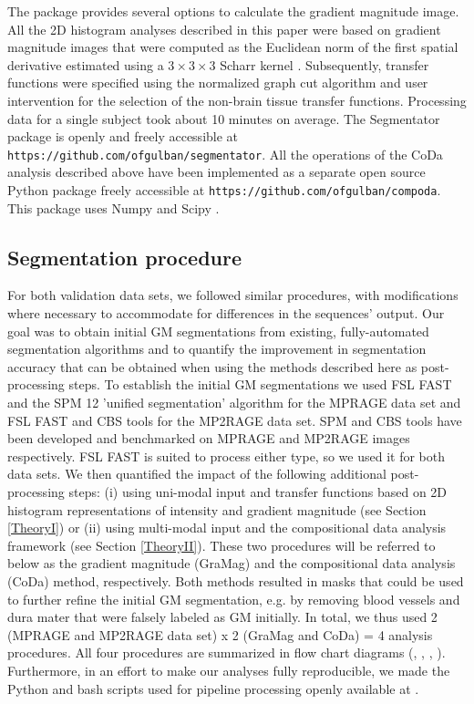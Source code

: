 The package provides several options to calculate the gradient magnitude image. All the 2D histogram analyses described in this paper were based on gradient magnitude images that were computed as the Euclidean norm of the first spatial derivative estimated using a $3 \times 3 \times 3$ Scharr kernel \cite{Scharr2000, Jahne2000}. Subsequently, transfer functions were specified using the normalized graph cut algorithm and user intervention for the selection of the non-brain tissue transfer functions. Processing data for a single subject took about 10 minutes on average. The Segmentator package is openly and freely accessible at \texttt{https://github.com/ofgulban/segmentator}. All the operations of the CoDa analysis described above have been implemented as a separate open source Python package \cite{compoda} freely accessible at \texttt{https://github.com/ofgulban/compoda}. This package uses Numpy \cite{numpy2011} and Scipy \cite{scipy2001}.

\subsection{Segmentation procedure}
For both validation data sets, we followed similar procedures, with modifications where necessary to accommodate for differences in the sequences' output. Our goal was to obtain initial GM segmentations from existing, fully-automated segmentation algorithms and to quantify the improvement in segmentation accuracy that can be obtained when using the methods described here as post-processing steps. To establish the initial GM segmentations we used FSL FAST \cite{Zhang2001} and the SPM 12 'unified segmentation' algorithm \cite{Ashburner2005} for the MPRAGE data set and FSL FAST and CBS tools \cite{Bazin2014} for the MP2RAGE data set. SPM and CBS tools have been developed and benchmarked on MPRAGE and MP2RAGE images respectively. FSL FAST is suited to process either type, so we used it for both data sets. We then quantified the impact of the following additional post-processing steps: (i) using uni-modal input and transfer functions based on 2D histogram representations of intensity and gradient magnitude (see Section \ref{TheoryI}) or (ii) using multi-modal input and the compositional data analysis framework (see Section \ref{TheoryII}). These two procedures will be referred to below as the gradient magnitude (GraMag) and the compositional data analysis (CoDa) method, respectively. Both methods resulted in masks that could be used to further refine the initial GM segmentation, e.g. by removing blood vessels and dura mater that were falsely labeled as GM initially. In total, we thus used 2 (MPRAGE and MP2RAGE data set) x 2 (GraMag and CoDa) = 4 analysis procedures. All four procedures are summarized in flow chart diagrams (, , , ). Furthermore, in an effort to make our analyses fully reproducible, we made the Python and bash scripts used for pipeline processing openly available at \cite{segmentator_processing_scripts}.

